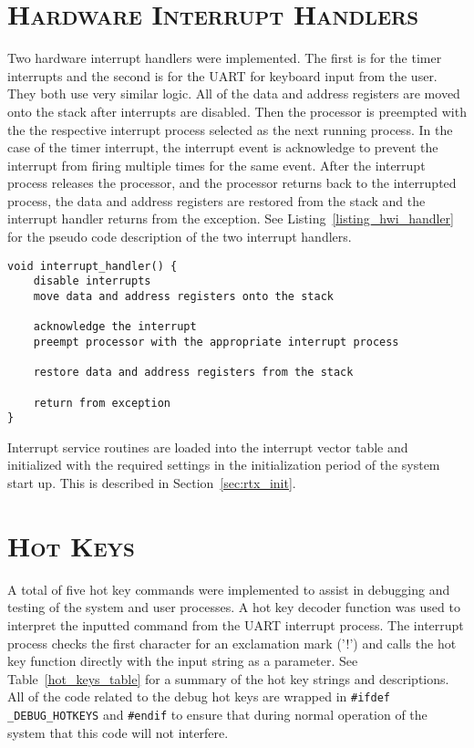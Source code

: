 \documentclass[oneside]{report}
\begin{document}
\section{\textsc{Hardware Interrupt Handlers}}
\label{sec:hard_isr}
Two hardware interrupt handlers were implemented. The first is for the timer
interrupts and the second is for the UART for keyboard input from the user.
They both use very similar logic. All of the data and address registers are
moved onto the stack after interrupts are disabled. Then the processor is
preempted with the the respective interrupt process selected as the next
running process. In the case of the timer interrupt, the interrupt event is
acknowledge to prevent the interrupt from firing multiple times for the same
event. After the interrupt process releases the processor, and the processor
returns back to the interrupted process, the data and address registers are
restored from the stack and the interrupt handler returns from the exception.
See Listing~\ref{listing_hwi_handler} for the pseudo code description of the
two interrupt handlers.

\begin{lstlisting}
void interrupt_handler() {
    disable interrupts
    move data and address registers onto the stack

    acknowledge the interrupt
    preempt processor with the appropriate interrupt process

    restore data and address registers from the stack

    return from exception
}
\end{lstlisting}

Interrupt service routines are loaded into the interrupt vector table and
initialized with the required settings in the initialization period of the
system start up. This is described in Section~\ref{sec:rtx_init}.

\pagebreak

\section{\textsc{Hot Keys}}
\label{sec:hot_keys}

A total of five hot key commands were implemented to assist in debugging and
testing of the system and user processes. A hot key decoder function was used to
interpret the inputted command from the UART interrupt process. The interrupt
process checks the first character for an exclamation mark ('!') and calls the
hot key function directly with the input string as a parameter. See
Table~\ref{hot_keys_table} for a summary of the hot key strings and
descriptions. All of the code related to the debug hot keys are wrapped in
\texttt{\#ifdef \_DEBUG\_HOTKEYS} and \texttt{\#endif} to ensure that during 
normal operation of the system that this code will not interfere.
\end{document}
